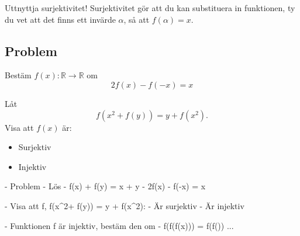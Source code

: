 \begin{metod}
	Uttnyttja surjektivitet! Surjektivitet gör att du kan substituera in funktionen, ty du vet att det finns ett invärde \(\alpha \), så att \(f(\alpha ) = x\).
\end{metod}

\subsection{Problem}
\begin{problem}
	Bestäm \(f(x) : \mathbb{R} \rightarrow \mathbb{R} \) om
	\[
		2f(x) - f(-x) = x
	\]
\end{problem}

\begin{problem}
	Låt 
	\[
		f(x^2+ f(y)) = y + f(x^2).
	\]
	Visa att \(f(x)\) är:
	\begin{itemize}
		\item Surjektiv
		\item Injektiv
	\end{itemize}
\end{problem}

\begin{problem}
	
\end{problem}





	- Problem
			- Lös
					-    f(x) + f(y) = x + y
					-    2f(x) - f(-x) = x

			- Visa att f, f(x^2+ f(y)) = y + f(x^2):
					- Är surjektiv
					- Är injektiv

			- Funktionen f är injektiv, bestäm den om
					- f(f(f(x))) = f(f()) ...
\fi




